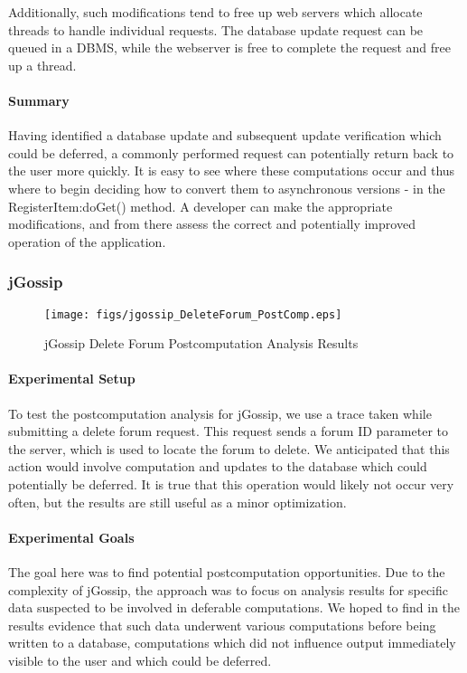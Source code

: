 \documentclass[msc,oneside]{ubcthesis}
\begin{document}
Additionally, such modifications tend to free up web servers which allocate threads to handle individual requests. The database update request can be queued in a DBMS, while the webserver is free to complete the request and free up a thread.

\paragraph{Summary}
Having identified a database update and subsequent update verification which could be deferred, a commonly performed request can potentially return back to the user more quickly. It is easy to see where these computations occur and thus where to begin deciding how to convert them to asynchronous versions - in the RegisterItem:doGet() method. A developer can make the appropriate modifications, and from there assess the correct and potentially improved operation of the application.

\subsubsection{jGossip} 

\begin{sidewaysfigure}
\centering
\scalebox{0.5}
{\texttt{[image: figs/jgossip\_DeleteForum\_PostComp.eps]}}
\caption{jGossip Delete Forum Postcomputation Analysis Results} 
\label{fig:deleteforumpostcomputation}
\end{sidewaysfigure}

\paragraph{Experimental Setup}
To test the postcomputation analysis for jGossip, we use a trace taken while submitting a delete forum request. This request sends a forum ID parameter to the server, which is used to locate the forum to delete. We anticipated that this action would involve computation and updates to the database which could potentially be deferred. It is true that this operation would likely not occur very often, but the results are still useful as a minor optimization. \\

\paragraph{Experimental Goals}
The goal here was to find potential postcomputation opportunities. Due to the complexity of jGossip, the approach was to focus on analysis results for specific data suspected to be involved in deferable computations. We hoped to find in the results evidence that such data underwent various computations before being written to a database, computations which did not influence output immediately visible to the user and which could be deferred.
\end{document}
